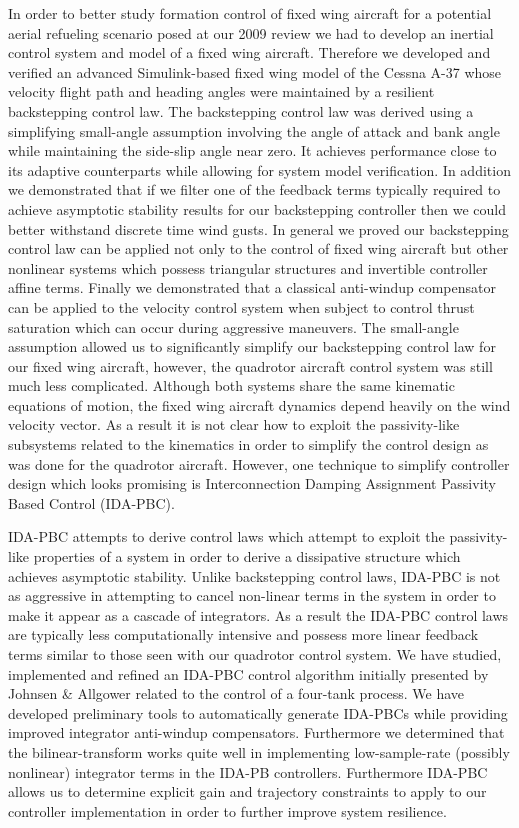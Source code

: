     In order to better study formation control of fixed wing aircraft for a potential aerial refueling scenario posed at our 2009 review we had to develop an inertial control system and model of a fixed wing aircraft.  Therefore we developed and verified an advanced Simulink-based fixed wing model of the Cessna A-37 whose velocity flight path and heading angles were maintained by a resilient backstepping control law.  The backstepping control law was derived using a simplifying small-angle assumption involving the angle of attack and bank angle while maintaining the side-slip angle near zero.  It achieves performance close to its adaptive counterparts while allowing for system model verification.  In addition we demonstrated that if we filter one of the feedback terms typically required to achieve asymptotic stability results for our backstepping controller then we could better withstand discrete time wind gusts.  In general we proved our backstepping control law can be applied not only to the control of fixed wing aircraft but other nonlinear systems which possess triangular structures and invertible controller affine terms.  Finally we demonstrated that a classical anti-windup compensator can be applied to the velocity control system when subject to control thrust saturation which can occur during aggressive maneuvers.  The small-angle assumption allowed us to significantly simplify our backstepping control law for our fixed wing aircraft, however, the quadrotor aircraft control system was still much less complicated.  Although both systems share the same kinematic equations of motion, the fixed wing aircraft dynamics depend heavily on the wind velocity vector.  As a result it is not clear how to exploit the passivity-like subsystems related to the kinematics in order to simplify the control design as was done for the quadrotor aircraft.  However, one technique to simplify controller design which looks promising is Interconnection Damping Assignment Passivity Based Control (IDA-PBC).

    IDA-PBC attempts to derive control laws which attempt to exploit the passivity-like properties of a system in order to derive a dissipative structure which achieves asymptotic stability.  Unlike backstepping control laws, IDA-PBC is not as aggressive in attempting to cancel non-linear terms in the system in order to make it appear as a cascade of integrators.  As a result the IDA-PBC control laws are typically less computationally intensive and possess more linear feedback terms similar to those seen with our quadrotor control system. We have studied, implemented and refined an IDA-PBC control algorithm initially presented by Johnsen \& Allgower related to the control of a four-tank process.  We have developed preliminary tools to automatically generate IDA-PBCs while providing improved integrator anti-windup compensators.  Furthermore we determined that the bilinear-transform works quite well in implementing low-sample-rate (possibly nonlinear) integrator terms in the IDA-PB controllers.  Furthermore IDA-PBC allows us to determine explicit gain and trajectory constraints to apply to our controller implementation in order to further improve system resilience.

